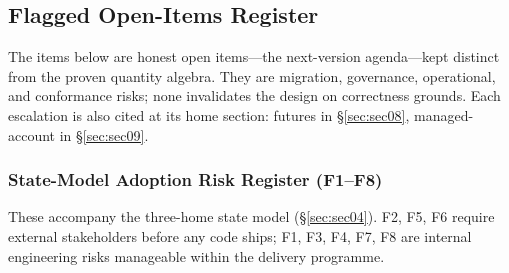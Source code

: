 \subsection{Flagged Open-Items Register}

The items below are honest open items---the next-version agenda---kept distinct from the proven quantity algebra. They are migration, governance, operational, and conformance risks; none invalidates the design on correctness grounds. Each escalation is also cited at its home section: futures in \S\ref{sec:sec08}, managed-account in \S\ref{sec:sec09}.

\subsubsection{State-Model Adoption Risk Register (F1--F8)}

These accompany the three-home state model (\S\ref{sec:sec04}). F2, F5, F6 require external stakeholders before any code ships; F1, F3, F4, F7, F8 are internal engineering risks manageable within the delivery programme.

